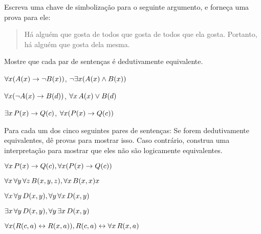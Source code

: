 \solutions
\problempart
\label{pr.likes}
Escreva uma chave de simboliza\c c\~ao para o seguinte argumento, e forne\c ca uma prova para ele:
\begin{quote}
H\'a algu\'em que gosta de todos que gosta de todos que ela gosta. Portanto, h\'a algu\'em que gosta dela mesma.
\end{quote}


\problempart
Mostre que cada par de senten\c cas \'e dedutivamente equivalente.
\begin{earg}
\item $\forall x (\mathord{A}(x)\rightarrow \neg \mathord{B}(x))$, $\neg\exists x(\mathord{A}(x) \wedge \mathord{B}(x))$
\item $\forall x (\neg\mathord{A}(x)\rightarrow \mathord{B}(d))$, $\forall x\,\mathord{A}(x) \vee \mathord{B}(d)$
\item $\exists x\,\mathord{P}(x) \rightarrow \mathord{Q}(c)$, $\forall x (\mathord{P}(x) \rightarrow \mathord{Q}(c))$
\end{earg}

\solutions
\problempart
\label{pr.FOLequivornot}
Para cada um dos cinco seguintes pares de senten\c cas: Se forem dedutivamente equivalentes, d\^e provas para mostrar isso. Caso contr\'ario, construa uma interpreta\c c\~ao para mostrar que eles n\~ao s\~ao logicamente equivalentes.
\begin{earg}
\item $\forall x\,\mathord{P}(x) \rightarrow \mathord{Q}(c), \forall x (\mathord{P}(x) \rightarrow \mathord{Q}(c))$
\item $\forall x\,\forall y\, \forall z\,\mathord{B}(x,y,z), \forall x\,\mathord{B}(x,x)x$
\item $\forall x\,\forall y\,\mathord{D}(x,y), \forall y\,\forall x\,\mathord{D}(x,y)$
\item $\exists x\,\forall y\,\mathord{D}(x,y), \forall y\,\exists x\,\mathord{D}(x,y)$
\item $\forall x (\mathord{R}(c,a) \leftrightarrow \mathord{R}(x,a)), \mathord{R}(c,a) \leftrightarrow \forall x\,\mathord{R}(x,a)$
\end{earg}

